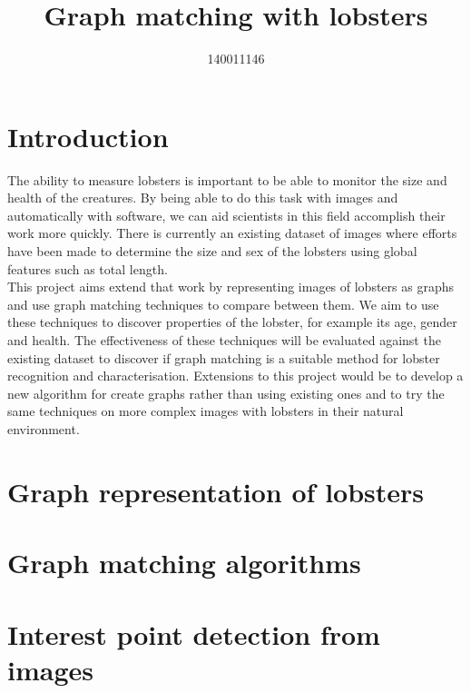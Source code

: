 \documentclass{article}
\title{Graph matching with lobsters}
\author{140011146}
\newcommand{\n}[0]{\\[\baselineskip]}
\begin{document}
\maketitle

\section{Introduction}
The ability to measure lobsters is important to be able to monitor the size and health of the creatures. By being able to do this task with images and automatically with software, we can aid scientists in this field accomplish their work more quickly. There is currently an existing dataset of images where efforts have been made to determine the size and sex of the lobsters using global features such as total length.
\n
This project aims extend that work by representing images of lobsters as graphs and use graph matching techniques to compare between them. We aim to use these techniques to discover properties of the lobster, for example its age, gender and health. The effectiveness of these techniques will be evaluated against the existing dataset to discover if graph matching is a suitable method for lobster recognition and characterisation. Extensions to this project would be to develop a new algorithm for create graphs rather than using existing ones and to try the same techniques on more complex images with lobsters in their natural environment.


\section{Graph representation of lobsters}

\section{Graph matching algorithms}

\section{Interest point detection from images}
\end{document}

